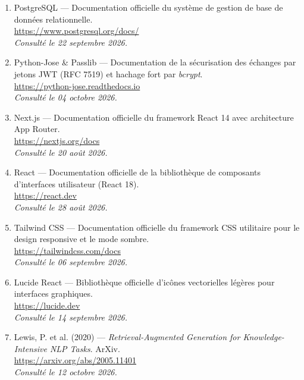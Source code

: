 \begin{enumerate}
  \item PostgreSQL — Documentation officielle du système de gestion de base de données relationnelle.\\
        \url{https://www.postgresql.org/docs/}\\
        \textit{Consulté le 22 septembre 2026.}

  \item Python-Jose \& Passlib — Documentation de la sécurisation des échanges par jetons JWT (RFC 7519) et hachage fort par \textit{bcrypt}.\\
        \url{https://python-jose.readthedocs.io}\\
        \textit{Consulté le 04 octobre 2026.}


  \item Next.js — Documentation officielle du framework React 14 avec architecture App Router.\\
        \url{https://nextjs.org/docs}\\
        \textit{Consulté le 20 août 2026.}

  \item React — Documentation officielle de la bibliothèque de composants d'interfaces utilisateur (React 18).\\
        \url{https://react.dev}\\
        \textit{Consulté le 28 août 2026.}

  \item Tailwind CSS — Documentation officielle du framework CSS utilitaire pour le design responsive et le mode sombre.\\
        \url{https://tailwindcss.com/docs}\\
        \textit{Consulté le 06 septembre 2026.}

  \item Lucide React — Bibliothèque officielle d'icônes vectorielles légères pour interfaces graphiques.\\
        \url{https://lucide.dev}\\
        \textit{Consulté le 14 septembre 2026.}


  \item Lewis, P. et al. (2020) — \textit{Retrieval-Augmented Generation for Knowledge-Intensive NLP Tasks}. ArXiv.\\
        \url{https://arxiv.org/abs/2005.11401}\\
        \textit{Consulté le 12 octobre 2026.}


\end{enumerate}
